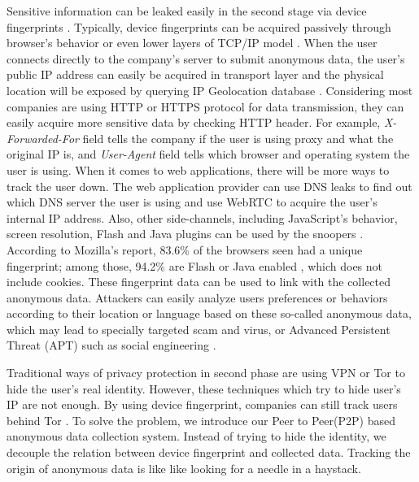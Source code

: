 \documentclass[twocolumn]{article}
\begin{document}
Sensitive information can be leaked easily in the second stage via device fingerprints \cite{yen2012host}. Typically, device fingerprints can be acquired passively through browser's behavior or even lower layers of TCP/IP model \cite{nikiforakis2013cookieless} \cite{neumann2012empirical}. When the user connects directly to the company's server to submit anonymous data, the user's public IP address can easily be acquired in transport layer and the physical location will be exposed by querying IP Geolocation database \cite{katz2006towards}. Considering most companies are using HTTP or HTTPS protocol for data transmission, they can easily acquire more sensitive data by checking HTTP header. For example, \textit{X-Forwarded-For} field tells the company if the user is using proxy and what the original IP is, and \textit{User-Agent} field tells which browser and operating system the user is using. When it comes to web applications, there will be more ways to track the user down. The web application provider can use DNS leaks to find out which DNS server the user is using and use WebRTC to acquire the user's internal IP address. Also, other side-channels, including JavaScript's behavior, screen resolution, Flash and Java plugins can be used by the snoopers \cite{mozilla}. According to Mozilla's report, 83.6\% of the browsers seen had a unique fingerprint; among those, 94.2\% are Flash or Java enabled \cite{mozilla}, which does not include cookies. These fingerprint data can be used to link with the collected anonymous data. Attackers can easily analyze users preferences or behaviors according to their location or language based on these so-called anonymous data, which may lead to specially targeted scam and virus, or Advanced Persistent Threat (APT) such as social engineering \cite{daly2009advanced}.

Traditional ways of privacy protection in second phase are using VPN or Tor to hide the user's real identity. However, these techniques which try to hide user's IP are not enough. By using device fingerprint, companies can still track users behind Tor \cite{wang2013improved}. To solve the problem, we introduce our Peer to Peer(P2P) based anonymous data collection system. Instead of trying to hide the identity, we decouple the relation between device fingerprint and collected data. Tracking the origin of anonymous data is like like looking for a needle in a haystack.
\end{document}
